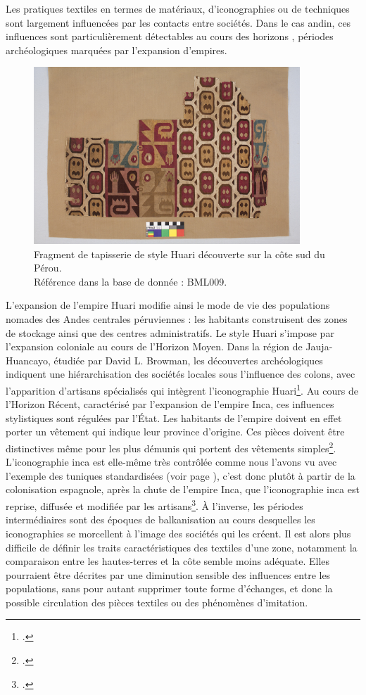 Les pratiques textiles en termes de matériaux, d'iconographies ou de techniques sont largement influencées par les contacts entre sociétés. Dans le cas andin, ces influences sont particulièrement détectables au cours des \og horizons \fg, périodes archéologiques marquées par l'expansion d'empires.  
\begin{figure}[!ht]
       \begin{center}
        		\includegraphics[width=10cm]{../images/BML009_IMG_3240.jpg}
	\end{center}
    \caption{Fragment de tapisserie de style Huari découverte sur la côte sud du Pérou.\\ Référence dans la base de donnée : BML009.}
    \label{fig:BML009}
\end{figure}
L'expansion de l'empire Huari modifie ainsi le mode de vie des populations nomades des Andes centrales péruviennes : les habitants construisent des zones de stockage ainsi que des centres administratifs. Le style Huari s'impose par l'expansion coloniale au cours de l'Horizon Moyen. Dans la région de Jauja-Huancayo, étudiée par David L. Browman, les découvertes archéologiques indiquent une hiérarchisation des sociétés locales sous l'influence des colons, avec l'apparition d'artisans spécialisés qui intègrent l'iconographie Huari\footcite[p.~191]{browmanPastoralNomadismAndes1974}. 
Au cours de l'Horizon Récent, caractérisé par l'expansion de l'empire Inca, ces influences stylistiques sont régulées par l'État. Les habitants de l'empire doivent en effet porter un vêtement qui indique leur province d'origine. Ces pièces doivent être distinctives même pour les plus démunis qui portent des vêtements simples\footcite[p.~193]{cousinRobeFemmeOrigine2016}. L'iconographie inca est elle-même très contrôlée comme nous l'avons vu avec l'exemple des tuniques standardisées (voir page \pageref{fig:damier}), c'est donc plutôt à partir de la colonisation espagnole, après la chute de l'empire Inca, que l'iconographie inca est reprise, diffusée et modifiée par les artisans\footcite[p.~53]{nilesArtistEmpireInca1994}. À l'inverse, les périodes intermédiaires sont des époques de balkanisation au cours desquelles les iconographies se morcellent à l'image des sociétés qui les créent. Il est alors plus difficile de définir les traits caractéristiques des textiles d'une zone, notamment la comparaison entre les hautes-terres et la côte semble moins adéquate. Elles pourraient être décrites par une diminution sensible des influences entre les populations, sans pour autant supprimer toute forme d'échanges, et donc la possible circulation des pièces textiles ou des phénomènes d'imitation.

